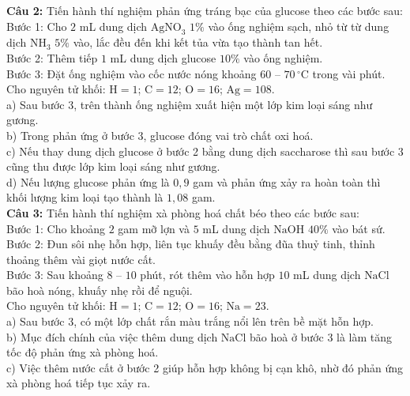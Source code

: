 \documentclass[12pt,a4paper]{article}
\begin{document}
\noindent \textbf{Câu 2:} Tiến hành thí nghiệm phản ứng tráng bạc của glucose theo các bước sau:\\
Bước 1: Cho $2$ mL dung dịch $\text{AgNO}_3$ $1\%$ vào ống nghiệm sạch, nhỏ từ từ dung dịch $\text{NH}_3$ $5\%$ vào, lắc đều đến khi kết tủa vừa tạo thành tan hết.\\
Bước 2: Thêm tiếp $1$ mL dung dịch glucose $10\%$ vào ống nghiệm.\\
Bước 3: Đặt ống nghiệm vào cốc nước nóng khoảng $60$ -- $70\,^{\circ}\text{C}$ trong vài phút.\\
Cho nguyên tử khối: $\text{H} = 1$; $\text{C} = 12$; $\text{O} = 16$; $\text{Ag} = 108$.\\
\noindent a) Sau bước 3, trên thành ống nghiệm xuất hiện một lớp kim loại sáng như gương.\\

\noindent b) Trong phản ứng ở bước 3, glucose đóng vai trò chất oxi hoá.\\

\noindent c) Nếu thay dung dịch glucose ở bước 2 bằng dung dịch saccharose thì sau bước 3 cũng thu được lớp kim loại sáng như gương.\\

\noindent d) Nếu lượng glucose phản ứng là $0{,}9$ gam và phản ứng xảy ra hoàn toàn thì khối lượng kim loại tạo thành là $1{,}08$ gam.\\

\noindent \textbf{Câu 3:} Tiến hành thí nghiệm xà phòng hoá chất béo theo các bước sau:\\
Bước 1: Cho khoảng $2$ gam mỡ lợn và $5$ mL dung dịch $\text{NaOH}$ $40\%$ vào bát sứ.\\
Bước 2: Đun sôi nhẹ hỗn hợp, liên tục khuấy đều bằng đũa thuỷ tinh, thỉnh thoảng thêm vài giọt nước cất.\\
Bước 3: Sau khoảng $8$ -- $10$ phút, rót thêm vào hỗn hợp $10$ mL dung dịch $\text{NaCl}$ bão hoà nóng, khuấy nhẹ rồi để nguội.\\
Cho nguyên tử khối: $\text{H} = 1$; $\text{C} = 12$; $\text{O} = 16$; $\text{Na} = 23$.\\
\noindent a) Sau bước 3, có một lớp chất rắn màu trắng nổi lên trên bề mặt hỗn hợp.\\

\noindent b) Mục đích chính của việc thêm dung dịch $\text{NaCl}$ bão hoà ở bước 3 là làm tăng tốc độ phản ứng xà phòng hoá.\\

\noindent c) Việc thêm nước cất ở bước 2 giúp hỗn hợp không bị cạn khô, nhờ đó phản ứng xà phòng hoá tiếp tục xảy ra.\\
\end{document}
